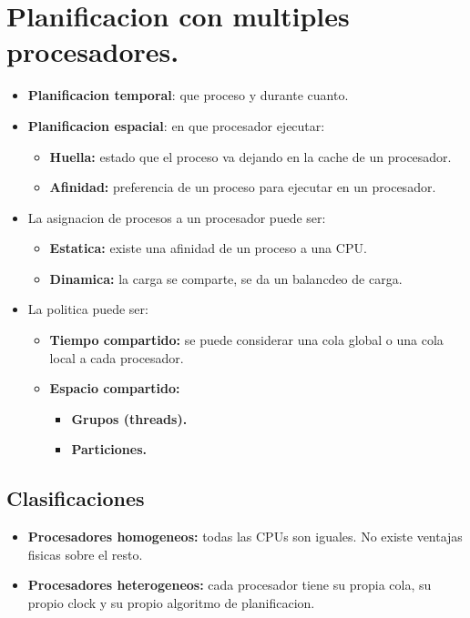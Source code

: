 \documentclass[11pt]{article}
\begin{document}
\section{Planificacion con multiples procesadores.}
\begin{itemize}
    \item \textbf{Planificacion temporal}: que proceso y durante cuanto.
    \item \textbf{Planificacion espacial}: en que procesador ejecutar:
    \begin{itemize}
        \item \textbf{Huella:} estado que el proceso va dejando en la cache de un procesador.
        \item \textbf{Afinidad:} preferencia de un proceso para ejecutar en un procesador.
    \end{itemize}
    \item La asignacion de procesos a un procesador puede ser:
        \begin{itemize}
            \item \textbf{Estatica:} existe una afinidad de un proceso a una CPU.
            \item \textbf{Dinamica:} la carga se comparte, se da un balancdeo de carga.
        \end{itemize}
    \item La politica puede ser:
        \begin{itemize}
            \item \textbf{Tiempo compartido:} se puede considerar una cola global o una cola local a cada procesador.
            \item \textbf{Espacio compartido:} 
                \begin{itemize}
                    \item \textbf{Grupos (threads).}
                    \item \textbf{Particiones.}
                \end{itemize}
        \end{itemize}
\end{itemize}


\subsection{Clasificaciones}
\begin{itemize}
    \item \textbf{Procesadores homogeneos:} todas las CPUs son iguales. No existe ventajas fisicas sobre el resto.
    \item \textbf{Procesadores heterogeneos:} cada procesador tiene su propia cola, su propio clock y su propio algoritmo de planificacion.
\end{itemize}
\end{document}
